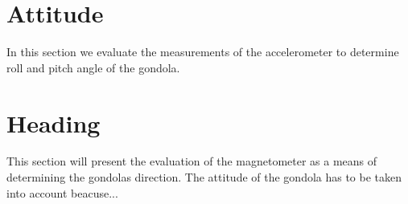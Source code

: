 

\section{Attitude \label{sec:res:attitude}}
In this section we evaluate the measurements of the accelerometer to determine roll and pitch angle of the gondola.

\section{Heading \label{sec:res:heading}}
This section will present the evaluation of the magnetometer as a means of determining the gondolas direction. The attitude of the gondola has to be taken into account beacuse...